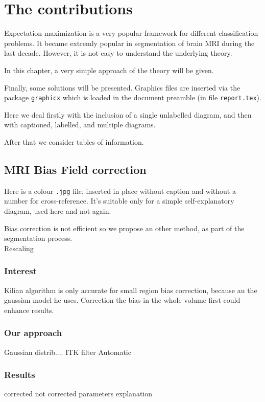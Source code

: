 \chapter{The contributions}\label{sec:contributions}
Expectation-maximization is a very popular framework for different classification problems. It became extremly popular in segmentation of brain MRI during the last decade. However, it is not easy to understand the underlying theory.
\par
In this chapter, a very simple approach of the theory will be given.
\par
\par
Finally, some solutions will be presented.
Graphics files are inserted via the package \texttt{graphicx} which is
loaded in the document preamble (in file \texttt{report.tex}).
\par
Here we deal firstly with the inclusion of a single unlabelled diagram,
and then with captioned, labelled, and multiple diagrams.
\par
After that we consider tables of information.
%
\section{MRI Bias Field correction}
Here is a colour \texttt{.jpg} file, inserted in place without caption
and without a number for cross-reference. It's suitable only for a
simple self-explanatory diagram, used here and not again.

Bias correction is not efficient so we propose an other method, as part of the segmentation process.\\
Rescaling

\subsection{Interest}

Kilian algorithm is only accurate for small region bias correction, because au the gaussian model he uses.
Correction the bias in the whole volume first could enhance results.

\subsection{Our approach}

Gaussian distrib....
ITK filter
Automatic
\subsection{Results}
corrected not corrected
parameters explanation

